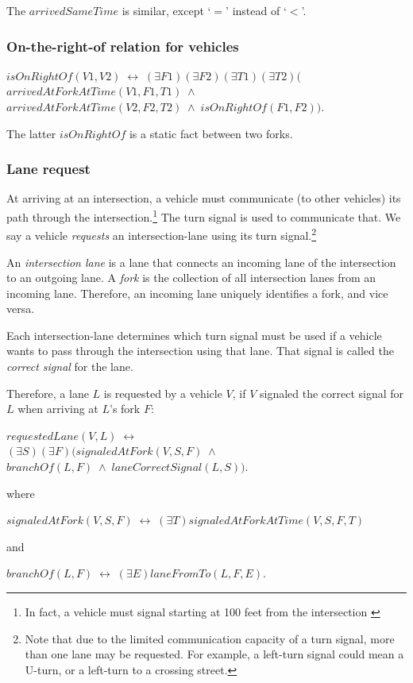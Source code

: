 The $arrivedSameTime$ is similar,
except `$=$' instead of `$<$'.
\subsubsection{On-the-right-of relation for vehicles}
\begin{center}
    $ isOnRightOf(V1, V2) \; \leftrightarrow \; (\exists F1)(\exists F2)(\exists T1)(\exists T2) \Big( $ \\
    $ arrivedAtForkAtTime(V1, F1, T1)\; \land $ \\
    $ arrivedAtForkAtTime(V2, F2, T2) \; \land \; isOnRightOf(F1, F2) \Big).$
\end{center}
The latter $isOnRightOf$ is a static fact between two forks.

\subsubsection{Lane request}
At arriving at an intersection,
a vehicle must communicate (to other vehicles) its path through the intersection.\footnote{In fact, a vehicle must signal starting at 100 feet from the intersection \cite[p. 61]{DMV-California.2019}}
The turn signal is used to communicate that.
We say a vehicle \emph{requests} an intersection-lane using its turn signal.\footnote{Note that
due to the limited communication capacity of a turn signal,
more than one lane may be requested.
For example,
a left-turn signal could mean a U-turn,
or a left-turn to a crossing street.}

An \emph{intersection lane} is a lane
that connects an incoming lane of the intersection to an outgoing lane.
A \emph{fork} is the collection of all intersection lanes from an incoming lane.
Therefore,
an incoming lane uniquely identifies a fork, and vice versa.

Each intersection-lane determines
which turn signal must be used
if a vehicle wants to pass through the intersection using that lane.
That signal is called the \emph{correct signal} for the lane.

Therefore,
a lane $L$ is requested by a vehicle $V$,
if $V$ signaled the correct signal for $L$
when arriving at $L$'s fork $F$:
\begin{center}
    $ requestedLane(V, L) \; \leftrightarrow  $ \\
    $ (\exists S)(\exists F) \Big( signaledAtFork(V, S, F) \; \land $ \\
    $ branchOf(L, F) \; \land \; laneCorrectSignal(L, S) \Big). $
\end{center}
where
\begin{center}
    $ signaledAtFork(V, S, F) \; \leftrightarrow \; (\exists T) signaledAtForkAtTime(V, S, F, T) $
\end{center}
and
\begin{center}
    $ branchOf(L, F) \; \leftrightarrow \; (\exists E) laneFromTo(L, F, E) $.
\end{center}



